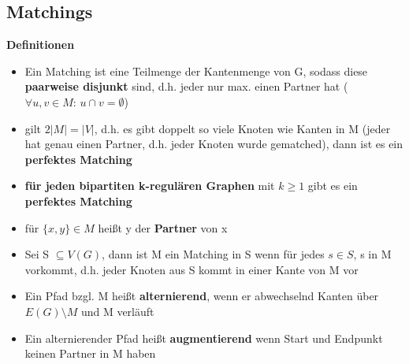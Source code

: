 \documentclass[12pt,a4paper]{article}
\begin{document}
\subsection{Matchings}
\textbf{Definitionen}\\
\begin{itemize}
\item Ein Matching ist eine Teilmenge der Kantenmenge von G, sodass diese \textbf{paarweise disjunkt} sind, d.h. jeder nur max. einen Partner hat ($\forall u, v \in M: \, u \cap v = \emptyset$)
\item gilt $2 \vert M \vert = \vert V \vert$, d.h. es gibt doppelt so viele Knoten wie Kanten in M (jeder hat genau einen Partner, d.h. jeder Knoten wurde gematched), dann ist es ein \textbf{perfektes Matching}
\item \textbf{für jeden bipartiten k-regulären Graphen} mit $k \geq 1$ gibt es ein \textbf{perfektes Matching}
\item für $\{x,y\} \in M$ heißt y der \textbf{Partner} von x
\item Sei S $\subseteq V(G)$, dann ist M ein Matching in S wenn für jedes $s\in S$, s in M vorkommt, d.h. jeder Knoten aus S kommt in einer Kante von M vor
\item Ein Pfad bzgl. M heißt \textbf{alternierend}, wenn er abwechselnd Kanten über $E(G) \setminus M$ und M verläuft
\item Ein alternierender Pfad heißt \textbf{augmentierend} wenn Start und Endpunkt keinen Partner in M haben
\end{itemize}
\begin{figure}[H]
\centering
{}
\end{figure}
\end{document}
